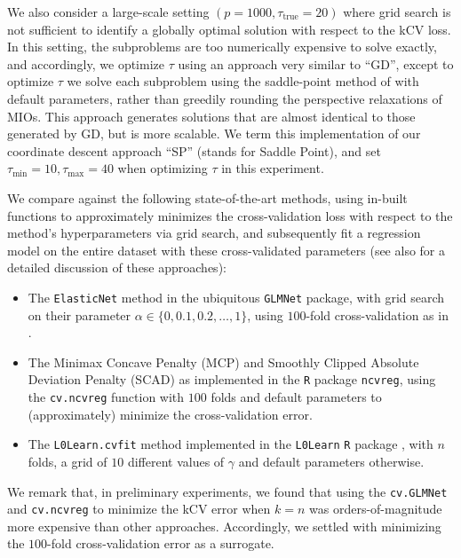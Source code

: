 \documentclass[mnsc,nonblindrev]{informs3} %
\begin{document}
We also consider a large-scale setting $(p=1000, \tau_{\text{true}}=20)$ where grid search is not sufficient to identify a globally optimal solution with respect to the kCV loss. In this setting, the subproblems are too numerically expensive to solve exactly, and accordingly, we optimize $\tau$ using an approach very similar to ``GD'', except to optimize $\tau$ we solve each subproblem using the saddle-point method of \cite{bertsimas2020sparse2} with default parameters, rather than greedily rounding the perspective relaxations of MIOs. This approach generates solutions that are almost identical to those generated by GD, but is more scalable. We term this implementation of our coordinate descent approach ``SP'' (stands for Saddle Point), and set $\tau_{\min}=10, \tau_{\max}=40$ when optimizing $\tau$ in this experiment. 

We compare against the following state-of-the-art methods, using in-built functions to approximately minimizes the cross-validation loss with respect to the method's hyperparameters via grid search, and subsequently fit a regression model on the entire dataset with these cross-validated parameters (see also \cite{bertsimas2020sparse2} for a detailed discussion of these approaches):
\begin{itemize}
    \item The \verb|ElasticNet| method in the ubiquitous \verb|GLMNet| package, with grid search on their parameter $\alpha \in \{0, 0.1, 0.2, \ldots, 1\}$, using $100$-fold cross-validation as in \citep{bertsimas2020sparse2}. 
    \item The Minimax Concave Penalty (MCP) and Smoothly Clipped Absolute Deviation Penalty (SCAD) as implemented in the \verb|R| package \verb|ncvreg|, using the \verb|cv.ncvreg| function with $100$ folds and default parameters to (approximately) minimize the cross-validation error.
    \item The \verb|L0Learn.cvfit| method implemented in the \verb|L0Learn| \verb|R| package \citep[cf.][]{hazimeh2020fast}, with $n$ folds, a grid of $10$ different values of $\gamma$ and default parameters otherwise. 
\end{itemize}

We remark that, in preliminary experiments, we found that using the \verb|cv.GLMNet| and \verb|cv.ncvreg| to minimize the kCV error when $k=n$ was orders-of-magnitude more expensive than other approaches. Accordingly, we settled with minimizing the $100$-fold cross-validation error as a surrogate.
\end{document}
